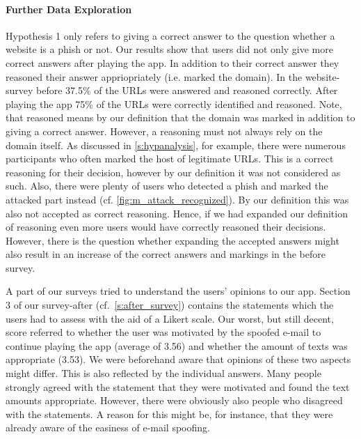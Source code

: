 \paragraph{Further Data Exploration}
\begin{description}[leftmargin=0cm]
	\item[Correct and Reasoned Answers:] Hypothesis 1 only refers to giving a correct answer to the question whether a website is a phish or not.
	Our results show that users did not only give more correct answers after playing the app.
	In addition to their correct answer they reasoned their answer appriopriately (i.e. marked the domain).
	In the website-survey before 37.5\% of the URLs were answered and reasoned correctly.
	After playing the app 75\% of the URLs were correctly identified and reasoned. 
	Note, that reasoned means by our definition that the domain was marked in addition to giving a correct answer.
	However, a reasoning must not always rely on the domain itself. 
	As discussed in \autoref{s:hypanalysis}, for example, there were numerous participants who often marked the host of legitimate URLs.
	This is a correct reasoning for their decision, however by our definition it was not considered as such.
	Also, there were plenty of users who detected a phish and marked the attacked part instead (cf. \autoref{fig:m_attack_recognized}).
	By our definition this was also not accepted as correct reasoning.
	Hence, if we had expanded our definition of reasoning even more users would have correctly reasoned their decisions.
	However, there is the question whether expanding the accepted answers might also result in an increase of the correct answers and markings in the before survey.
	\item[User Opinions to App:] A part of our surveys tried to understand the users' opinions to our app.
	Section 3 of our survey-after (cf.~\autoref{s:after_survey}) contains the statements which the users had to assess with the aid of a Likert scale.
	Our worst, but still decent, score referred to whether the user was motivated by the spoofed e-mail to continue playing the app (average of 3.56) and whether the amount of texts was appropriate (3.53).
	We were beforehand aware that opinions of these two aspects might differ.
	This is also reflected by the individual answers.
	Many people strongly agreed with the statement that they were motivated and found the text amounts appropriate.
	However, there were obviously also people who disagreed with the statements.
	A reason for this might be, for instance, that they were already aware of the easiness of e-mail spoofing.

\end{description}
